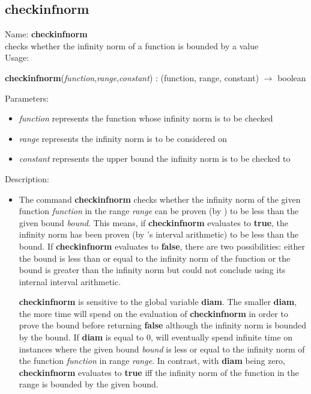 \subsection{checkinfnorm}
\label{labcheckinfnorm}
\noindent Name: \textbf{checkinfnorm}\\
checks whether the infinity norm of a function is bounded by a value\\
\noindent Usage: 
\begin{center}
\textbf{checkinfnorm}(\emph{function},\emph{range},\emph{constant}) : (\textsf{function}, \textsf{range}, \textsf{constant}) $\rightarrow$ \textsf{boolean}\\
\end{center}
Parameters: 
\begin{itemize}
\item \emph{function} represents the function whose infinity norm is to be checked
\item \emph{range} represents the infinity norm is to be considered on
\item \emph{constant} represents the upper bound the infinity norm is to be checked to
\end{itemize}
\noindent Description: \begin{itemize}

\item The command \textbf{checkinfnorm} checks whether the infinity norm of the given
   function \emph{function} in the range \emph{range} can be proven (by \sollya) to
   be less than the given bound \emph{bound}. This means, if \textbf{checkinfnorm}
   evaluates to \textbf{true}, the infinity norm has been proven (by \sollya's
   interval arithmetic) to be less than the bound. If \textbf{checkinfnorm} evaluates
   to \textbf{false}, there are two possibilities: either the bound is less than
   or equal to the infinity norm of the function or the bound is greater
   than the infinity norm but \sollya could not conclude using its
   internal interval arithmetic.
    
   \textbf{checkinfnorm} is sensitive to the global variable \textbf{diam}. The smaller \textbf{diam},
   the more time \sollya will spend on the evaluation of \textbf{checkinfnorm} in
   order to prove the bound before returning \textbf{false} although the infinity
   norm is bounded by the bound. If \textbf{diam} is equal to $0$, \sollya will
   eventually spend infinite time on instances where the given bound
   \emph{bound} is less or equal to the infinity norm of the function
   \emph{function} in range \emph{range}. In contrast, with \textbf{diam} being zero,
   \textbf{checkinfnorm} evaluates to \textbf{true} iff the infinity norm of the function in
   the range is bounded by the given bound.
\end{itemize}
